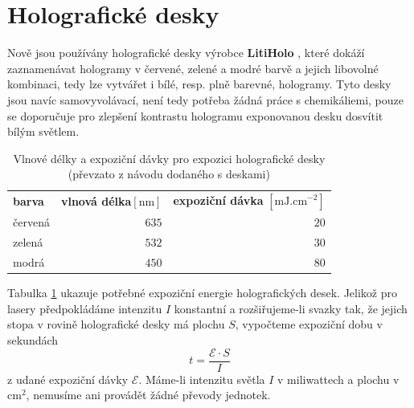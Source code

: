 \documentclass[twoside,project]{../MFFPrace}
\begin{document}
\section{Holografické desky}
Nově jsou používány holografické desky výrobce \textbf{LitiHolo} \cite{litiholo}, které dokáží zaznamenávat hologramy v červené, zelené a modré barvě a jejich libovolné kombinaci, tedy lze vytvářet i bílé, resp. plně barevné, hologramy. Tyto desky jsou navíc samovyvolávací, není tedy potřeba žádná práce s chemikáliemi, pouze se doporučuje pro zlepšení kontrastu hologramu exponovanou desku dosvítit bílým světlem.

\begin{table}
    \caption{Vlnové délky a expoziční dávky pro expozici holografické desky (převzato z návodu dodaného s deskami)}
    \centering
    \begin{tabular}{|l|r|r|}
        \hline
        \textbf{barva} & \textbf{vlnová délka}\footnotemark[1] $\left[\text{nm}\right]$ & \textbf{expoziční dávka} $\left[\text{mJ.cm}^{-2}\right]$ \\
        červená        & $635$                                                                                                                             & $20$                                                      \\
        zelená         & $532$                                                                                                                             & $30$                                                      \\
        modrá          & $450$                                                                                                                             & $80$                                                      \\
        \hline
    \end{tabular}
    \label{tbl:expozicni-davky}
\end{table}

Tabulka \ref{tbl:expozicni-davky} ukazuje potřebné expoziční energie holografických desek. Jelikož pro lasery předpokládáme intenzitu $I$ konstantní a rozšiřujeme-li svazky tak, že jejich stopa v rovině holografické desky má plochu $S$, vypočteme expoziční dobu v sekundách
\begin{equation}
    t=\frac{\mathcal{E}\cdot S}{I}
    \label{eqn:expozicni-doba}
\end{equation}
z udané expoziční dávky $\mathcal{E}$. Máme-li intenzitu světla $I$ v miliwattech a plochu v $\text{cm}^2$, nemusíme ani provádět žádné převody jednotek.
\end{document}

